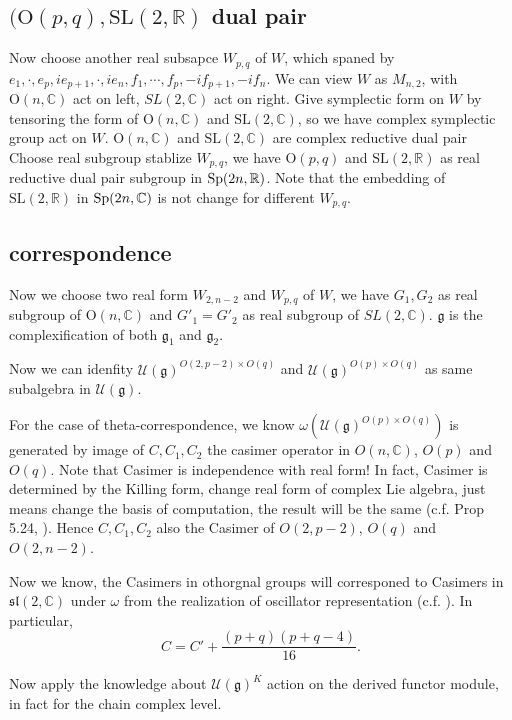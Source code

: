 \documentclass[12pt]{article}
\def\bR{{\mathbb{R}}}
\def\bC{{\mathbb{C}}}
\def\Sp{{\rm Sp}}
\def\SL{{\rm SL}}
\def\asl{\mathfrak{sl}}
\def\fgg{\mathfrak{g}}
\def\cuu{\mathcal{U}}
\def\OO{\mathrm{O}}
\def\SL{\mathrm{SL}}
\begin{document}
\subsection{$(\OO(p,q),\SL(2,\bR)$ dual pair}
Now choose another real subsapce $W_{p,q}$ of $W$, 
which spaned by $e_1,\cdot, e_p, ie_{p+1},\cdot,ie_{n}, 
f_1, \cdots, f_p, -if_{p+1}, -if_n$. We can view $W$ as $M_{n,2}$, 
with $\OO(n,\bC)$ act on left, $SL(2,\bC)$ act on right. 
Give symplectic form on $W$ by tensoring the form 
of $\OO(n,\bC)$ and $\SL(2,\bC)$, so we have complex symplectic group act on $W$.
$\OO(n,\bC)$ and $\SL(2,\bC)$ are complex reductive dual pair 
Choose real subgroup stablize $W_{p,q}$, we have $\OO(p,q)$ and $\SL(2,\bR)$ 
as real reductive dual pair subgroup in $\Sp(2n,\bR)$. 
Note that the embedding of $\SL(2,\bR)$ in $\Sp(2n,\bC)$ is not change for
different $W_{p,q}$.



\subsection{correspondence}
Now we choose two real form $W_{2,n-2}$ and $W_{p,q}$ of $W$, we have
$G_1, G_2$ as real subgroup of $\OO(n,\bC)$ and $G'_1=G'_2$ as real subgroup 
of $SL(2,\bC)$. $\fgg$ is the complexification of both $\fgg_1$ and $\fgg_2$. 

Now we can idenfity $\cuu(\fgg)^{O(2,p-2)\times O(q)}$ and
$\cuu(\fgg)^{O(p)\times O(q)}$ as same subalgebra in $\cuu(\fgg)$.

For the case of theta-correspondence, we know $\omega(\cuu(\fgg)^{O(p)\times O(q)})$
is generated by image of $C,C_1,C_2$ the casimer operator in $O(n,\bC)$,
$O(p)$ and $O(q)$. Note that Casimer is independence with real form!
In fact, Casimer is determined by the Killing form, change real form of complex
Lie algebra, just means change the basis of computation, the result will be 
the same (c.f. Prop 5.24, \cite{Knapp1996Lie}).
Hence $C, C_1, C_2$ also the Casimer of $O(2,p-2)$, $O(q)$ and $O(2,n-2)$.

Now we know, the Casimers in othorgnal groups will corresponed to Casimers 
in $\asl(2,\bC)$ under $\omega$ 
from the realization of oscillator representation (c.f. \cite{Howe1979Opq}).
In particular, 
\[
C = C' + \frac{(p+q)(p+q-4)}{16}.
\]

Now apply the knowledge about $\cuu(\fgg)^K$ action on 
the derived functor module, in fact for the chain complex level.
\end{document}
